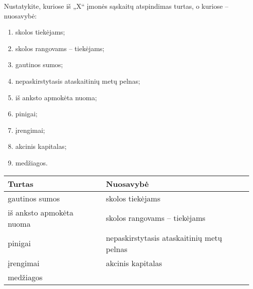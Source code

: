 \begin{tasks}
  
  \begin{task}
    \begin{condition}
      Nustatykite, kuriose iš „X“ įmonės sąskaitų atspindimas turtas,
      o kuriose – nuosavybė:
      \begin{enumerate}
        \item skolos tiekėjams;
        \item skolos rangovams – tiekėjams;
        \item gautinos sumos;
        \item nepaskirstytasis ataskaitinių metų pelnas;
        \item iš anksto apmokėta nuoma;
        \item pinigai;
        \item įrengimai;
        \item akcinis kapitalas;
        \item medžiagos.
      \end{enumerate}
    \end{condition}
    \begin{solution}
      \begin{tabularx}{\tablewidth}[]{X | X}
        Turtas & Nuosavybė \\
        \hline
        gautinos sumos
          & skolos tiekėjams \\
        iš anksto apmokėta nuoma
          & skolos rangovams – tiekėjams \\
        pinigai
          & nepaskirstytasis ataskaitinių metų pelnas \\
        įrengimai
          & akcinis kapitalas \\
        medžiagos & \\
      \end{tabularx}
    \end{solution}
  \end{task}


\end{tasks}
